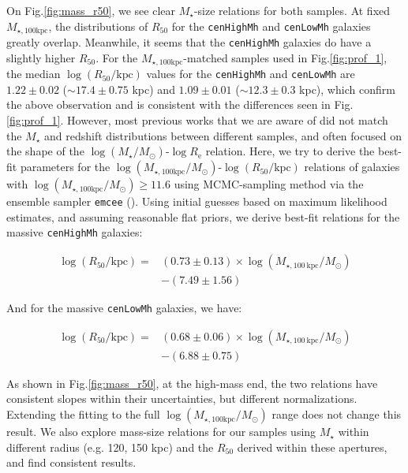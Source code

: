 \documentclass{emulateapj}
\def\rbcg{\texttt{cenHighMh}}
\def\nbcg{\texttt{cenLowMh}}
\def\mstar{{$M_{\star}$}}
\def\logms{{$\log (M_{\star}/M_{\odot})$}}
\def\mtot{{$M_{\star,100\mathrm{kpc}}$}}
\def\logmtot{{$\log (M_{\star,100\mathrm{kpc}}/M_{\odot})$}}
\begin{document}
\begin{CJK*}{UTF8}{gbsn}
    On Fig.\ref{fig:mass_r50}, we see clear \mstar{}-size relations for both samples.  
    At fixed \mtot{}, the distributions of $R_{\mathrm{50}}$ for the \rbcg{} and
    \nbcg{} galaxies greatly overlap.  
    Meanwhile, it seems that the \rbcg{} galaxies do have a slightly higher 
    $R_{\mathrm{50}}$. 
    For the \mtot{}-matched samples used in Fig.\ref{fig:prof_1}, the median 
    $\log (R_{\mathrm{50}}/\mathrm{kpc})$ values for the \rbcg{} and \nbcg{} are 
    $1.22\pm 0.02$ ($\sim 17.4\pm 0.75$ kpc) and $1.09\pm 0.01$ 
    ($\sim 12.3\pm0.3$ kpc), which confirm the above observation and is consistent with 
    the differences seen in Fig.\ref{fig:prof_1}. 
    However, most previous works that we are aware of did not match the \mstar{} 
    and redshift distributions between different samples, and often focused on the shape 
    of the \logms{}-$\log R_{\mathrm{e}}$ relation.  
    Here, we try to derive the best-fit parameters for the 
    \logmtot{}-$\log (R_{\mathrm{50}}/\mathrm{kpc})$ relations of galaxies with 
    \logmtot{}$\geq 11.6$ using MCMC-sampling method via the ensemble sampler 
    \texttt{emcee} (\citealt{Emcee}). 
    Using initial guesses based on maximum likelihood estimates, and assuming reasonable 
    flat priors, we derive best-fit relations for the massive \rbcg{} galaxies:
    
    \begin{equation}
        \begin{aligned}
        \log (R_{\mathrm{50}}/\mathrm{kpc}) = & (0.73\pm0.13) \times \log (M_{\star, 100\ \mathrm{kpc}}/M_{\odot}) \\ & -(7.49\pm1.56)
        \end{aligned}
    \end{equation}

    \noindent And for the massive \nbcg{} galaxies, we have:
    
    \begin{equation}
        \begin{aligned}
        \log (R_{\mathrm{50}}/\mathrm{kpc}) = & (0.68\pm0.06) \times \log (M_{\star, 100\ \mathrm{kpc}}/M_{\odot}) \\ & -(6.88\pm0.75)
        \end{aligned}
    \end{equation}
    
    \noindent As shown in Fig.\ref{fig:mass_r50}, at the high-mass end, the two relations 
    have consistent slopes within their uncertainties, but different normalizations. 
    Extending the fitting to the full \logmtot{} range does not change this result. 
    We also explore mass-size relations for our samples using \mstar{} within different 
    radius (e.g. 120, 150 kpc) and the $R_{\mathrm{50}}$ derived within these apertures, 
    and find consistent results.
    

\end{CJK*}
\end{document}
